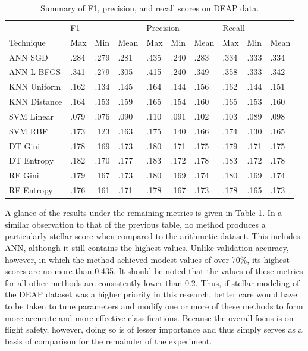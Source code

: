 \documentclass[12pt]{uthesis-v12}  %
\begin{document}
\begin{table}[!t]
\caption{Summary of F1, precision, and recall scores on DEAP data.}
\renewcommand{\arraystretch}{1.3}
\centering
{\begin{tabular}{*{10}{l}}
\toprule
& \multicolumn{3}{l}{F1} & \multicolumn{3}{l}{Precision} & \multicolumn{3}{l}{Recall} \\
Technique & Max & Min & Mean & Max & Min & Mean & Max & Min & Mean \\ \midrule
ANN SGD & .284 & .279 & .281 & .435 & .240 & .283 & .334 & .333 & .334 \\
ANN L-BFGS & .341 & .279 & .305 & .415 & .240 & .349 & .358 & .333 & .342 \\
KNN Uniform & .162 & .134 & .145 & .164 & .144 & .156 & .162 & .144 & .151 \\
KNN Distance & .164 & .153 & .159 & .165 & .154 & .160 & .165 & .153 & .160 \\
SVM Linear & .079 & .076 & .090 & .110 & .091 & .102 & .103 & .089 & .098 \\
SVM RBF & .173 & .123 & .163 & .175 & .140 & .166 & .174 & .130 & .165 \\
DT Gini & .178 & .169 & .173 & .180 & .171 & .175 & .179 & .171 & .175 \\
DT Entropy & .182 & .170 & .177 & .183 & .172 & .178 & .183 & .172 & .178 \\
RF Gini & .179 & .167 & .173 & .180 & .169 & .174 & .180 & .169 & .174 \\
RF Entropy & .176 & .161 & .171 & .178 & .167 & .173 & .178 & .165 & .173 \\ \bottomrule
\end{tabular}}

\label{fpr-deap}
\end{table}

A glance of the results under the remaining metrics is given in Table \ref{fpr-deap}. In a similar observation to that of the previous table, no method produces a particularly stellar score when compared to the arithmetic dataset. This includes ANN, although it still contains the highest values. Unlike validation accuracy, however, in which the method achieved modest values of over 70\%, its highest scores are no more than 0.435. It should be noted that the values of these metrics for all other methods are consistently lower than 0.2. Thus, if stellar modeling of the DEAP dataset was a higher priority in this research, better care would have to be taken to tune parameters and modify one or more of these methods to form more accurate and more effective classifications. Because the overall focus is on flight safety, however, doing so is of lesser importance and thus simply serves as a basis of comparison for the remainder of the experiment. 
\end{document}
